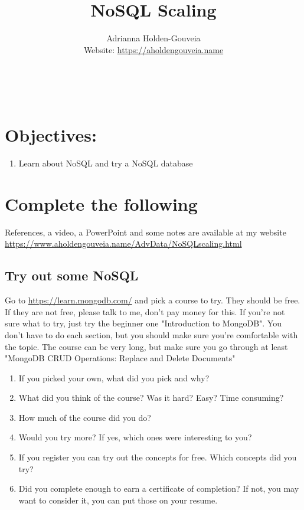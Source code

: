 \documentclass[12pt]{article}
\title{NoSQL Scaling}
\author{
        Adrianna Holden-Gouveia \\
        Website: \url{https://aholdengouveia.name}\\ 
        \date{\vspace{-5ex}}
        \faLinkedin{: aholdengouveia} \\
        \faGithub {: aholdengouveia} \\
        }
\begin{document}
    

\maketitle


\section*{Objectives:}
\begin{enumerate}
    \item Learn about NoSQL and try a NoSQL database
\end{enumerate}
\section*{Complete the following}

References, a video, a PowerPoint and some notes are available at my website
\url {https://www.aholdengouveia.name/AdvData/NoSQLscaling.html}




\subsection*{Try out some NoSQL}

Go to \url{https://learn.mongodb.com/} and pick a course to try.  They should be free.  If they are not free, please talk to me, don't pay money for this.  If you're not sure what to try, just try the beginner one "Introduction to MongoDB".  You don't have to do each section, but you should make sure you're comfortable with the topic.  The course can be very long, but make sure you go through at least "MongoDB CRUD Operations: Replace and Delete Documents"


    \begin{enumerate}
        \item If you picked your own, what did you pick and why?
        \item What did you think of the course? Was it hard? Easy? Time consuming? 
        \item How much of the course did you do?
        \item Would you try more? If yes, which ones were interesting to you?
        \item If you register you can try out the concepts for free.  Which concepts did you try?
        \item Did you complete enough to earn a certificate of completion? If not, you may want to consider it, you can put those on your resume.
    \end{enumerate}
\end{document}
